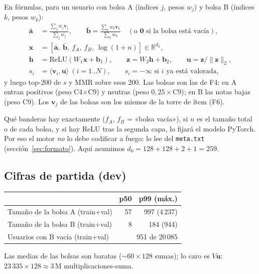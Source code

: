 \documentclass[a4paper,11pt]{article}
\newcommand{\cod}[1]{\texttt{#1}}
\begin{document}
En fórmulas, para un usuario con bolsa A (índices $j$, pesos $w_j$) y bolsa B (índices $k$, pesos $w_k$):
\begin{align*}
\bar{\mathbf{a}} &= \frac{\sum_j w_j \mathbf{v}_j}{\sum_j w_j}, \qquad
\bar{\mathbf{b}} = \frac{\sum_k w_k \mathbf{v}_k}{\sum_k w_k}\quad(\text{o }\mathbf{0}\text{ si la bolsa está vacía}),\\
\mathbf{x} &= [\bar{\mathbf{a}},\ \bar{\mathbf{b}},\ f_A,\ f_B,\ \log(1+n)] \in \mathbb{R}^{d_0},\\
\mathbf{h} &= \mathrm{ReLU}(W_1\mathbf{x} + \mathbf{b}_1),\qquad \mathbf{z} = W_2\mathbf{h} + \mathbf{b}_2,\qquad
\mathbf{u} = \mathbf{z}/\lVert\mathbf{z}\rVert_2,\\
s_i &= \langle \mathbf{v}_i, \mathbf{u}\rangle\ (i = 1..N),\qquad s_i = -\infty \text{ si $i$ ya está valorada},
\end{align*}
y luego top-200 de $s$ y MMR sobre esos 200. Las bolsas son las de F4: en A entran positivos (peso C4$\times$C9) y
neutras (peso $0{,}25\times$C9); en B las notas bajas (peso C9). Los $\mathbf{v}_j$ de las bolsas son los mismos de la
torre de ítem (F6).

\begin{ojo}
Qué banderas hay exactamente ($f_A$, $f_B$ = «bolsa vacía»), si $n$ es el tamaño total o de cada bolsa, y si hay
ReLU tras la segunda capa, lo fijará el modelo PyTorch. Por eso el motor \emph{no} lo debe codificar a fuego: lo lee
del \cod{meta.txt} (sección~\ref{sec:formato}). Aquí asumimos $d_0 = 128+128+2+1 = 259$.
\end{ojo}

\subsection{Cifras de partida (dev)}
\begin{center}
\begin{tabular}{lrr}
\toprule
& p50 & p99 (máx.) \\
\midrule
Tamaño de la bolsa A (train+val) & 57 & 997 (4\,237) \\
Tamaño de la bolsa B (train+val) & 8 & 184 (944) \\
Usuarios con B vacía (train+val) & \multicolumn{2}{r}{951 de 20\,085} \\
\bottomrule
\end{tabular}
\end{center}
Las medias de las bolsas son baratas ($\sim 60\times128$ sumas); lo caro es $V\mathbf{u}$: $23\,335\times128 \approx
3$\,M multiplicaciones-suma.
\end{document}
